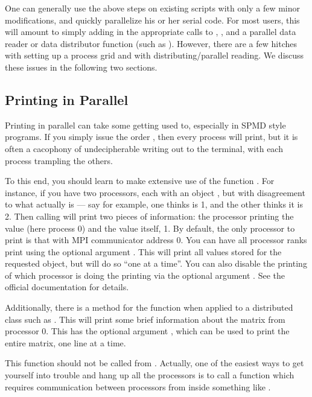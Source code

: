 One can generally use the above steps on existing  scripts with only a few minor modifications, and
quickly parallelize his or her serial code.   For most users, this will amount to simply adding in the appropriate calls to , , and a parallel data reader or data distributor function (such as ).  However, there are a few hitches with setting up a process grid and with distributing/parallel reading.  We discuss these issues in the following two sections.

\subsection[]{Printing in Parallel}

Printing in parallel can take some getting used to, especially in SPMD style programs.  If you simply issue the order , then every process will print, but it is often a cacophony of undecipherable writing out to the terminal, with each process trampling the others.  

To this end, you should learn to make extensive use of the  function .  For instance, if you have two processors, each with an object , but with disagreement to what  actually is --- say for example, one thinks  is 1, and the other thinks it is 2.  Then calling  will print two pieces of information:  the processor printing the value (here process 0) and the value itself, 1.  By default, the only processor to print is that with MPI communicator address 0.  You can have all processor ranks print using the optional argument .  This will print all values stored for the requested object, but will do so ``one at a time''.  You can also disable the printing of which processor is doing the printing via the optional argument .  See the official  documentation for details.

Additionally, there is a method for the  function when applied to a distributed class such as .  This will print some brief information about the matrix from processor 0.  This has the optional argument , which can be used to print the entire matrix, one line at a time.

This function should not be called from .  Actually, one of the easiest ways to get yourself into trouble and hang up all the processors is to call a function which requires communication between processors from inside something like .

